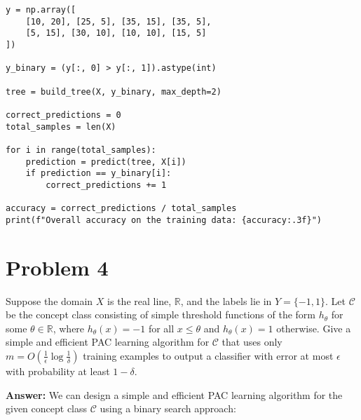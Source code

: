 \documentclass{article}
\begin{document}
{\begin{verbatim}
y = np.array([
    [10, 20], [25, 5], [35, 15], [35, 5],
    [5, 15], [30, 10], [10, 10], [15, 5]
])

y_binary = (y[:, 0] > y[:, 1]).astype(int)

tree = build_tree(X, y_binary, max_depth=2)

correct_predictions = 0
total_samples = len(X)

for i in range(total_samples):
    prediction = predict(tree, X[i])
    if prediction == y_binary[i]:
        correct_predictions += 1

accuracy = correct_predictions / total_samples
print(f"Overall accuracy on the training data: {accuracy:.3f}")
\end{verbatim}
}

\section*{Problem 4}

\noindent [10 points] Suppose the domain $X$ is the real line, $\mathbb{R}$, and the labels lie in $Y = \{-1,1\}$. Let $\mathcal{C}$ be the concept class consisting of simple threshold functions of the form $h_\theta$ for some $\theta \in \mathbb{R}$, where $h_\theta(x) = -1$ for all $x \leq \theta$ and $h_\theta(x) = 1$ otherwise. Give a simple and efficient PAC learning algorithm for $\mathcal{C}$ that uses only $m = O(\frac{1}{\epsilon} \log \frac{1}{\delta})$ training examples to output a classifier with error at most $\epsilon$ with probability at least $1 - \delta$.

\textbf{Answer:}
We can design a simple and efficient PAC learning algorithm for the given concept class $\mathcal{C}$ using a binary search approach:
\end{document}

